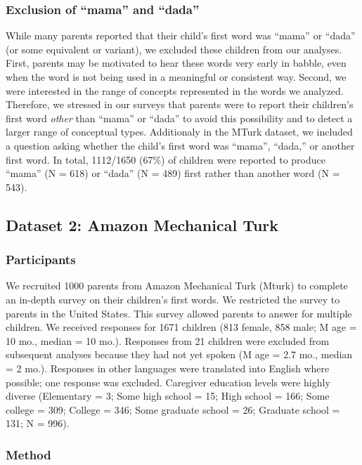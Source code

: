 \documentclass[10pt,letterpaper]{article}
\begin{document}
\subsubsection{Exclusion of ``mama'' and ``dada''}

While many parents reported that their child's first word was ``mama'' or ``dada'' (or some equivalent or variant), we excluded these children from our analyses. First, parents may be motivated to hear these words very early in babble, even when the word is not being used in a meaningful or consistent way. Second, we were interested in the range of concepts represented in the words we analyzed. Therefore, we stressed in our surveys that parents were to report their children's first word \emph{other} than ``mama'' or ``dada'' to avoid this possibility and to detect a larger range of conceptual types. Additionaly in the MTurk dataset, we included a question asking whether the child's first word was ``mama'', ``dada,'' or another first word. In total, 1112/1650 (67\%) of children were reported to produce ``mama'' (N = 618) or ``dada'' (N = 489) first rather than another word (N = 543).

\subsection{Dataset 2: Amazon Mechanical Turk}

\subsubsection{Participants}

We recruited 1000 parents from Amazon Mechanical Turk (Mturk) to complete an in-depth survey on their children's first words. We restricted the survey to parents in the United States. This survey allowed parents to answer for multiple children. We received responses for 1671 children (813 female, 858 male; M age = 10 mo., median = 10 mo.). Responses from 21 children were excluded from subsequent analyses because they had not yet spoken (M age = 2.7 mo., median = 2 mo.). Responses in other languages were translated into English where possible; one response was excluded. Caregiver education levels were highly diverse (Elementary = 3; Some high school = 15; High school = 166; Some college = 309; College = 346; Some graduate school = 26; Graduate school = 131; N = 996).

\subsubsection{Method}
\end{document}
